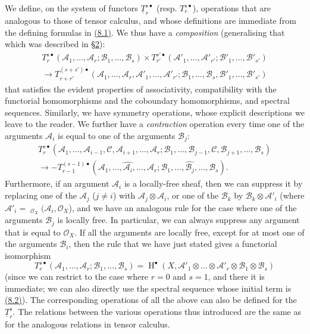 \documentclass{article}
\theoremstyle{plain}
\theoremstyle{definition}
\newcommand{\scr}[1]{{\mathscr{#1}}}
\DeclareMathOperator{\shHom}{\underline{Hom}}
\DeclareMathOperator{\HH}{H}
\newcommand{\oldpage}[1]{\marginpar{\footnotesize$\Big\vert$ \textit{p.~#1}}}
\begin{document}
We define, on the system of functors $\underline{T}_r^{s\bullet}$ (resp. $T_r^{s\bullet}$), operations that are analogous to those of tensor calculus, and whose definitions are immediate from the defining formulas in \hyperref[8.1]{(8.1)}.
We thus have a \emph{composition} (generalising that which was described in \hyperref[section2]{\S2}):
\[
\label{8.3}
  \begin{gathered}
    T_r^{s\bullet}(\scr{A}_1,\ldots,\scr{A}_r;\scr{B}_1,\ldots,\scr{B}_s)
    \times T_{r'}^{s'\bullet}(\scr{A}'_1,\ldots,\scr{A}'_{r'};\scr{B}'_1,\ldots,\scr{B}'_{s'})
  \\\to T_{r+r'}^{(s+s')\bullet}(\scr{A}_1,\ldots,\scr{A}_r,\scr{A}'_1,\ldots,\scr{A}'_{r'};\scr{B}_1,\ldots,\scr{B}_s,\scr{B}'_1,\ldots,\scr{B}'_{s'})
  \end{gathered}
\tag{8.3}
\]
that satisfies the evident properties of associativity, compatibility with the functorial homomorphisms and the coboundary homomorphisms, and spectral sequences.
Similarly, we have symmetry operations, whose explicit descriptions we leave to the reader.
We further have a \emph{contraction} operation every time one of the arguments $\scr{A}_i$
\oldpage{149-23}
is equal to one of the arguments $\scr{B}_j$:
\[
\label{8.4}
  \begin{gathered}
    T_r^{s\bullet}(\scr{A}_1,\ldots,\scr{A}_{i-1},\scr{C},\scr{A}_{i+1},\ldots,\scr{A}_r;\scr{B}_1,\ldots,\scr{B}_{j-1},\scr{C},\scr{B}_{j+1},\ldots,\scr{B}_s)
  \\\to -T_{r-1}^{(s-1)\bullet}(\scr{A}_1,\ldots,\widehat{\scr{A}_i},\ldots,\scr{A}_r;\scr{B}_1,\ldots,\widehat{\scr{B}_j},\ldots,\scr{B}_s).
  \end{gathered}
\tag{8.4}
\]
Furthermore, if an argument $\scr{A}_i$ is a locally-free sheaf, then we can suppress it by replacing one of the $\scr{A}_j$ ($j\neq i$) with $\scr{A}_j\otimes\scr{A}_i$, or one of the $\scr{B}_k$ by $\scr{B}_k\otimes\scr{A}'_i$ (where $\scr{A}'_i=\shHom_{\scr{O}_X}(\scr{A}_i,\scr{O}_X$), and we have an analogous rule for the case where one of the arguments $\scr{B}_j$ is locally free.
In particular, we can always suppress any argument that is equal to $\scr{O}_X$.
If all the arguments are locally free, except for at most one of the arguments $\scr{B}_i$, then the rule that we have just stated gives a functorial isomorphism
\[
\label{8.5}
  T_r^{s\bullet}(\scr{A}_1,\ldots,\scr{A}_r;\scr{B}_1,\ldots,\scr{B}_s)
  = \HH^\bullet(X,\scr{A}'_1\otimes\ldots\otimes\scr{A}'_{r}\otimes\scr{B}_1\otimes\scr{B}_s)
\tag{8.5}
\]
(since we can restrict to the case where $r=0$ and $s=1$, and there it is immediate; we can also directly use the spectral sequence whose initial term is \hyperref[8.2]{(8.2)}).
The corresponding operations of all the above can also be defined for the $\underline{T}_r^s$.
The relations between the various operations thus introduced are the same as for the analogous relations in tensor calculus.
\end{document}
